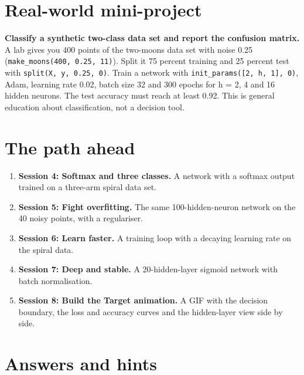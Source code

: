 \documentclass[11pt,a4paper]{article}
\begin{document}
\section{Real-world mini-project}
\textbf{Classify a synthetic two-class data set and report the confusion matrix.} A lab gives you 400 points of the two-moons data set with noise 0.25 (\texttt{make\_moons(400, 0.25, 11)}). Split it 75 percent training and 25 percent test with \texttt{split(X, y, 0.25, 0)}. Train a network with \texttt{init\_params([2, h, 1], 0)}, Adam, learning rate 0.02, batch size 32 and 300 epochs for h = 2, 4 and 16 hidden neurons. The test accuracy must reach at least 0.92. This is general education about classification, not a decision tool.

\section{The path ahead}
\begin{enumerate}[nosep]
\item \textbf{Session 4: Softmax and three classes.} A network with a softmax output trained on a three-arm spiral data set.
\item \textbf{Session 5: Fight overfitting.} The same 100-hidden-neuron network on the 40 noisy points, with a regulariser.
\item \textbf{Session 6: Learn faster.} A training loop with a decaying learning rate on the spiral data.
\item \textbf{Session 7: Deep and stable.} A 20-hidden-layer sigmoid network with batch normalisation.
\item \textbf{Session 8: Build the Target animation.} A GIF with the decision boundary, the loss and accuracy curves and the hidden-layer view side by side.
\end{enumerate}

\section{Answers and hints}
\end{document}

